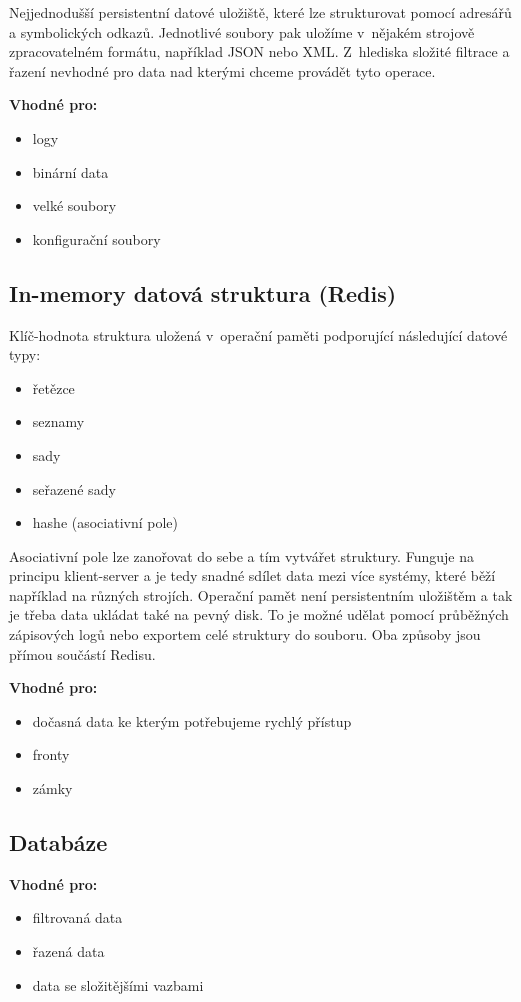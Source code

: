 Nejjednodušší persistentní datové uložiště, které lze strukturovat pomocí adresářů a symbolických odkazů.
Jednotlivé soubory pak uložíme v~nějakém strojově zpracovatelném formátu, například JSON nebo XML.
Z~hlediska složité filtrace a řazení nevhodné pro data nad kterými chceme provádět tyto operace.

\textbf{Vhodné pro:}
\begin{itemize}
	\item logy
	\item binární data
	\item velké soubory
	\item konfigurační soubory
\end{itemize}

\subsection{In-memory datová struktura (Redis)}

Klíč-hodnota struktura uložená v~operační paměti podporující následující datové typy:

\begin{itemize}
	\item řetězce
	\item seznamy
	\item sady
	\item seřazené sady
	\item hashe (asociativní pole)
\end{itemize}

Asociativní pole lze zanořovat do sebe a tím vytvářet struktury.
Funguje na principu klient-server a je tedy snadné sdílet data mezi více systémy, které běží například na různých strojích.
Operační pamět není persistentním uložištěm a tak je třeba data ukládat také na pevný disk.
To je možné udělat pomocí průběžných zápisových logů nebo exportem celé struktury do souboru.
Oba způsoby jsou přímou součástí Redisu.

\medskip\noindent
\textbf{Vhodné pro:}
\begin{itemize}
	\item dočasná data ke kterým potřebujeme rychlý přístup
	\item fronty
	\item zámky
\end{itemize}

\subsection{Databáze}

\medskip\noindent
\textbf{Vhodné pro:}
\begin{itemize}
	\item filtrovaná data
	\item řazená data
	\item data se složitějšími vazbami
\end{itemize}

